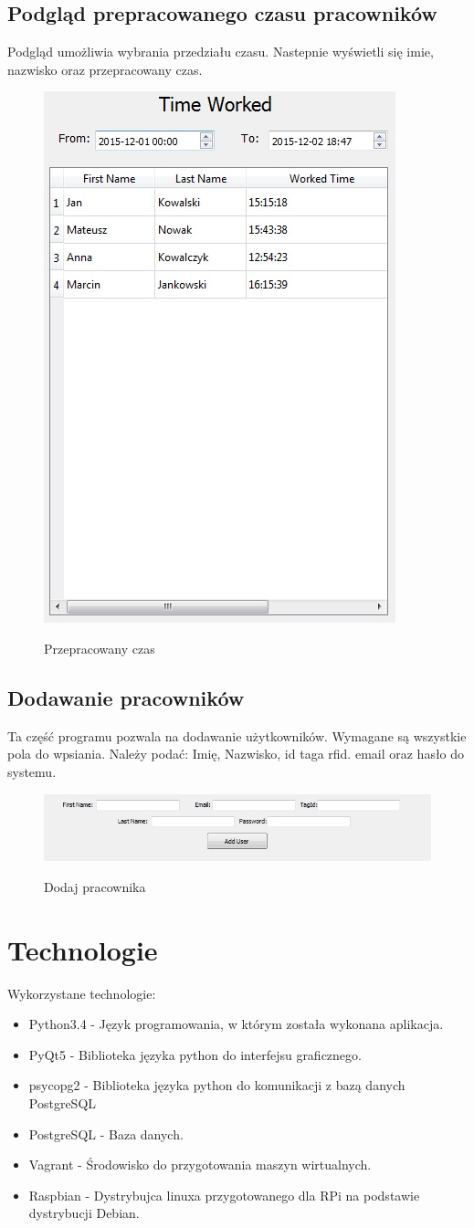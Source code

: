 \subsection{Podgląd prepracowanego czasu pracowników}
Podgląd umożliwia wybrania przedziału czasu. Nastepnie wyświetli się imie, nazwisko oraz przepracowany czas.
\begin{figure}[h!]
	\centering
	\includegraphics[width=0.37\linewidth]{img/time_worked.jpg}
	\label{fig:time_worked}
	\caption[Przepracowany czas]{Przepracowany czas}
\end{figure}
\newpage
\subsection{Dodawanie pracowników}
Ta część programu pozwala na dodawanie użytkowników. Wymagane są wszystkie pola do wpsiania.
Należy podać: Imię, Nazwisko, id taga rfid. email oraz hasło do systemu.
\begin{figure}[h!]
	\centering
	\includegraphics[width=0.80\linewidth]{img/add_user.jpg}
	\label{fig:add_user}
	\caption[Dodaj pracownika]{Dodaj pracownika}
\end{figure}

\section{Technologie}
Wykorzystane technologie:
\begin{itemize}
\item Python3.4 - Język programowania, w którym została wykonana aplikacja.
\item PyQt5 - Biblioteka języka python do interfejsu graficznego.
\item psycopg2 - Biblioteka języka python do komunikacji z bazą danych PostgreSQL
\item PostgreSQL - Baza danych.
\item Vagrant - Środowisko do przygotowania maszyn wirtualnych.
\item Raspbian - Dystrybujca linuxa przygotowanego dla RPi na podstawie dystrybucji Debian.
\end{itemize}
